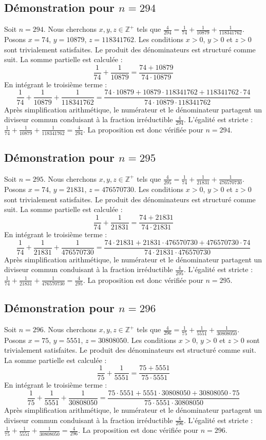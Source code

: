 \documentclass[11pt,a4paper]{article}
\begin{document}
\subsection{Démonstration pour $n = 294$}
Soit $n = 294$. Nous cherchons $x, y, z \in \mathbb{Z}^{+}$ tels que $\frac{4}{294} = \frac{1}{74} + \frac{1}{10879} + \frac{1}{118341762}$.
Posons $x = 74$, $y = 10879$, $z = 118341762$.
Les conditions $x > 0$, $y > 0$ et $z > 0$ sont trivialement satisfaites.
Le produit des dénominateurs est structuré comme suit. La somme partielle est calculée :
$$ \frac{1}{74} + \frac{1}{10879} = \frac{74+10879}{74 \cdot 10879} $$
En intégrant le troisième terme :
$$ \frac{1}{74} + \frac{1}{10879} + \frac{1}{118341762} = \frac{74 \cdot 10879 + 10879 \cdot 118341762 + 118341762 \cdot 74}{74 \cdot 10879 \cdot 118341762} $$
Après simplification arithmétique, le numérateur et le dénominateur partagent un diviseur commun conduisant à la fraction irréductible $\frac{4}{294}$.
L'égalité est stricte : $\frac{1}{74} + \frac{1}{10879} + \frac{1}{118341762} = \frac{4}{294}$.
La proposition est donc vérifiée pour $n = 294$.
\subsection{Démonstration pour $n = 295$}
Soit $n = 295$. Nous cherchons $x, y, z \in \mathbb{Z}^{+}$ tels que $\frac{4}{295} = \frac{1}{74} + \frac{1}{21831} + \frac{1}{476570730}$.
Posons $x = 74$, $y = 21831$, $z = 476570730$.
Les conditions $x > 0$, $y > 0$ et $z > 0$ sont trivialement satisfaites.
Le produit des dénominateurs est structuré comme suit. La somme partielle est calculée :
$$ \frac{1}{74} + \frac{1}{21831} = \frac{74+21831}{74 \cdot 21831} $$
En intégrant le troisième terme :
$$ \frac{1}{74} + \frac{1}{21831} + \frac{1}{476570730} = \frac{74 \cdot 21831 + 21831 \cdot 476570730 + 476570730 \cdot 74}{74 \cdot 21831 \cdot 476570730} $$
Après simplification arithmétique, le numérateur et le dénominateur partagent un diviseur commun conduisant à la fraction irréductible $\frac{4}{295}$.
L'égalité est stricte : $\frac{1}{74} + \frac{1}{21831} + \frac{1}{476570730} = \frac{4}{295}$.
La proposition est donc vérifiée pour $n = 295$.
\subsection{Démonstration pour $n = 296$}
Soit $n = 296$. Nous cherchons $x, y, z \in \mathbb{Z}^{+}$ tels que $\frac{4}{296} = \frac{1}{75} + \frac{1}{5551} + \frac{1}{30808050}$.
Posons $x = 75$, $y = 5551$, $z = 30808050$.
Les conditions $x > 0$, $y > 0$ et $z > 0$ sont trivialement satisfaites.
Le produit des dénominateurs est structuré comme suit. La somme partielle est calculée :
$$ \frac{1}{75} + \frac{1}{5551} = \frac{75+5551}{75 \cdot 5551} $$
En intégrant le troisième terme :
$$ \frac{1}{75} + \frac{1}{5551} + \frac{1}{30808050} = \frac{75 \cdot 5551 + 5551 \cdot 30808050 + 30808050 \cdot 75}{75 \cdot 5551 \cdot 30808050} $$
Après simplification arithmétique, le numérateur et le dénominateur partagent un diviseur commun conduisant à la fraction irréductible $\frac{4}{296}$.
L'égalité est stricte : $\frac{1}{75} + \frac{1}{5551} + \frac{1}{30808050} = \frac{4}{296}$.
La proposition est donc vérifiée pour $n = 296$.
\end{document}
